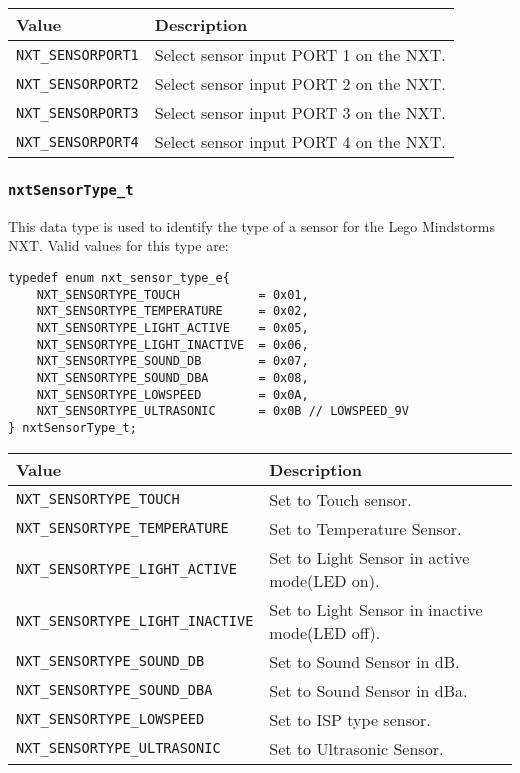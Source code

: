 
\noindent
\begin{tabular}{p{3.5cm}p{12cm}} \hline
Value &       Description\\
\hline
\texttt{NXT\_SENSORPORT1}&Select sensor input PORT 1 on the NXT.\\
\texttt{NXT\_SENSORPORT2}&Select sensor input PORT 2 on the NXT.\\
\texttt{NXT\_SENSORPORT3}&Select sensor input PORT 3 on the NXT.\\
\texttt{NXT\_SENSORPORT4}&Select sensor input PORT 4 on the NXT.\\
\hline
\end{tabular}

\subsubsection{\label{sec:nxtSensorType_t}\texttt{nxtSensorType\_t}}
This data type is used to identify the type of a sensor for the
Lego Mindstorms NXT. Valid values for this type are:

\begin{verbatim}
typedef enum nxt_sensor_type_e{
    NXT_SENSORTYPE_TOUCH           = 0x01,
    NXT_SENSORTYPE_TEMPERATURE     = 0x02,
    NXT_SENSORTYPE_LIGHT_ACTIVE    = 0x05,
    NXT_SENSORTYPE_LIGHT_INACTIVE  = 0x06,
    NXT_SENSORTYPE_SOUND_DB        = 0x07,
    NXT_SENSORTYPE_SOUND_DBA       = 0x08,
    NXT_SENSORTYPE_LOWSPEED        = 0x0A,
    NXT_SENSORTYPE_ULTRASONIC      = 0x0B // LOWSPEED_9V
} nxtSensorType_t;
\end{verbatim}



\noindent
\begin{tabular}{p{5.5cm}p{10cm}} \hline
Value &       Description\\
\hline
\texttt{NXT\_SENSORTYPE\_TOUCH}          &Set to Touch sensor.\\
\texttt{NXT\_SENSORTYPE\_TEMPERATURE}   &Set to Temperature Sensor.\\
\texttt{NXT\_SENSORTYPE\_LIGHT\_ACTIVE} &Set to Light Sensor in active mode(LED on).\\
\texttt{NXT\_SENSORTYPE\_LIGHT\_INACTIVE}&Set to Light Sensor in inactive mode(LED off).\\
\texttt{NXT\_SENSORTYPE\_SOUND\_DB}    &Set to Sound Sensor in dB.\\
\texttt{NXT\_SENSORTYPE\_SOUND\_DBA}   &Set to Sound Sensor in dBa.\\
\texttt{NXT\_SENSORTYPE\_LOWSPEED}     &Set to ISP type sensor.\\
\texttt{NXT\_SENSORTYPE\_ULTRASONIC}   &Set to Ultrasonic Sensor.\\
\hline
\end{tabular}

